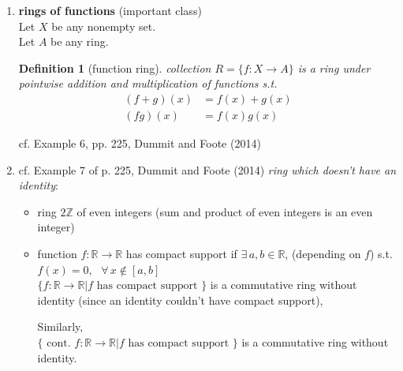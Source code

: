 \documentclass[10pt]{amsart}
\newtheorem{definition}{Definition}
\begin{document}
\begin{multicols*}{2}
\begin{enumerate}
Similarly define \emph{rational} Hamiltonian Quaternions ring by taking $a,b,c,d\in \mathbb{Q}$.  

real and rational Hamiltonian Quaternions both are divison rings, where inverse of nonzero element defined as 


\begin{equation}
(a+bi +cj + dk)^{-1} = \frac{ a-bi -cj -dk}{ a^2 + b^2 + c^2 + d^2 }
\end{equation} cf. Example 5, pp. 224, Dummit and Foote (2014)\cite{DuFo2003}

\item \textbf{rings of functions} (important class) \\
Let $X$ be any nonempty set. \\
Let $A$ be any ring. 

\begin{definition}[function ring]
	collection $R= \lbrace f:X\to A \rbrace$ is a ring under pointwise addition and multiplication of functions s.t. 
	\begin{equation}
	\begin{aligned}
	(f+g)(x) & = f(x) + g(x) \\
	(fg)(x) & = f(x)g(x)
	\end{aligned}
	\end{equation}
\end{definition}
	
cf. Example 6, pp. 225, Dummit and Foote (2014)\cite{DuFo2003}

\item cf. Example 7 of p. 225, Dummit and Foote (2014)\cite{DuFo2003} \emph{ring which doesn't have an identity}:

\begin{itemize}
	\item  ring $2\mathbb{Z}$ of even integers (sum and product of even integers is an even integer) \\
\item function $f: \mathbb{R} \to \mathbb{R}$ has compact support if $\exists \, a, b \in \mathbb{R}$, (depending on $f$) s.t. $f(x) = 0$, \quad \, $\forall \, x \notin [a,b]$ \\
$\lbrace f: \mathbb{R}\to \mathbb{R} | f \text{ has compact support } \rbrace$ is a commutative ring without identity (since an identity couldn't have compact support), 

Similarly, \\
$\lbrace \text{ cont. } f : \mathbb{R} \to \mathbb{R} | f \text{ has compact support } \rbrace$ is a commutative ring without identity. 
\end{itemize}	
\end{enumerate}


\end{multicols*}
\end{document}
